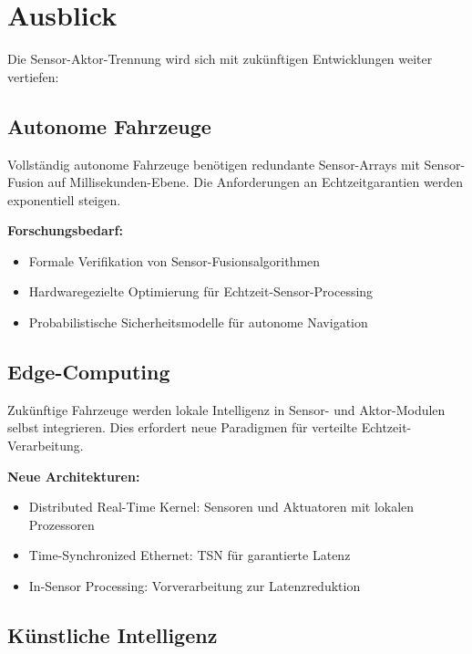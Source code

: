 ﻿\documentclass[a4paper,12pt]{article}
\begin{document}
\section{Ausblick}

Die Sensor-Aktor-Trennung wird sich mit zukünftigen Entwicklungen weiter vertiefen:

\subsection{Autonome Fahrzeuge}

Vollständig autonome Fahrzeuge benötigen redundante Sensor-Arrays mit Sensor-Fusion 
auf Millisekunden-Ebene. Die Anforderungen an Echtzeitgarantien werden exponentiell steigen.

\textbf{Forschungsbedarf:}
\begin{itemize}
	\item Formale Verifikation von Sensor-Fusionsalgorithmen
	\item Hardwaregezielte Optimierung für Echtzeit-Sensor-Processing
	\item Probabilistische Sicherheitsmodelle für autonome Navigation
\end{itemize}

\subsection{Edge-Computing}

Zukünftige Fahrzeuge werden lokale Intelligenz in Sensor- und Aktor-Modulen selbst 
integrieren. Dies erfordert neue Paradigmen für verteilte Echtzeit-Verarbeitung.

\textbf{Neue Architekturen:}
\begin{itemize}
	\item Distributed Real-Time Kernel: Sensoren und Aktuatoren mit lokalen Prozessoren
	\item Time-Synchronized Ethernet: TSN für garantierte Latenz
	\item In-Sensor Processing: Vorverarbeitung zur Latenzreduktion
\end{itemize}

\subsection{Künstliche Intelligenz}
\end{document}
